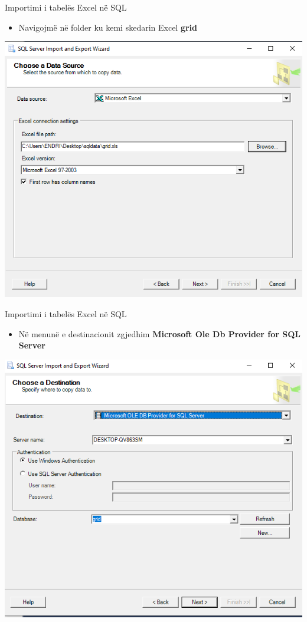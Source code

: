 \documentclass[
  ignorenonframetext,
]{beamer}
\providecommand{\tightlist}{%
  \setlength{\itemsep}{0pt}\setlength{\parskip}{0pt}}
\begin{document}
\begin{frame}{Importimi i tabelës Excel në SQL}
\label{importimi-i-tabeluxebs-excel-nuxeb-sql-4}
\begin{itemize}
\tightlist
\item
  Navigojmë në folder ku kemi skedarin Excel \textbf{grid}
\end{itemize}

\includegraphics{./Figs/db5.png}
\end{frame}

\begin{frame}{Importimi i tabelës Excel në SQL}
\label{importimi-i-tabeluxebs-excel-nuxeb-sql-5}
\begin{itemize}
\tightlist
\item
  Në menunë e destinacionit zgjedhim \textbf{Microsoft Ole Db Provider
  for SQL Server}
\end{itemize}

\includegraphics{./Figs/db6.png}
\end{frame}
\end{document}
